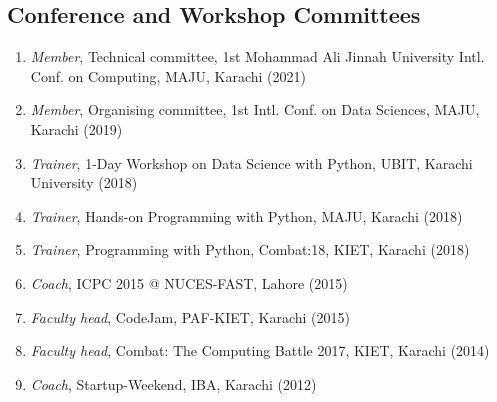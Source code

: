 \documentclass[a4paper, 10pt]{article}
\begin{document}
\subsection*{\textcolor{NavyBlue}{Conference and Workshop Committees}}
\begin{enumerate}
\itemsep-4pt
\item \emph{ Member}, Technical committee, 1st Mohammad Ali Jinnah University Intl. Conf. on Computing, MAJU, Karachi (2021)
\item \emph{ Member}, Organising committee, 1st Intl. Conf. on Data Sciences, MAJU, Karachi (2019)
\item \emph{ Trainer}, 1-Day Workshop on Data Science with Python, UBIT, Karachi University (2018)
\item \emph{ Trainer}, Hands-on Programming with Python, MAJU, Karachi (2018)
\item \emph{ Trainer}, Programming with Python, Combat:18, KIET, Karachi (2018)
\item \emph{ Coach}, ICPC 2015 @ NUCES-FAST, Lahore (2015)
\item \emph{ Faculty head}, CodeJam, PAF-KIET, Karachi (2015)
\item \emph{ Faculty head}, Combat: The Computing Battle 2017, KIET, Karachi (2014)
\item \emph{ Coach}, Startup-Weekend, IBA, Karachi (2012)
\end{enumerate}
\end{document}
